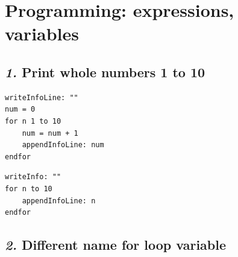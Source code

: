 \documentclass[12pt, english]{article}
\newcommand{\mysection}[2]{\setcounter{section}{#1}\addtocounter{section}{-1}\section{#2}}
\begin{document}

\mysection{2}{Programming: expressions, variables}
\vspace{10pt}

\subsection*{\emph{1.} Print whole numbers 1 to 10} 

\begin{lstlisting}
writeInfoLine: ""
num = 0
for n 1 to 10
    num = num + 1
    appendInfoLine: num
endfor
\end{lstlisting}

\begin{lstlisting}[rulesepcolor=\color{blue}]
writeInfo: ""
for n to 10
    appendInfoLine: n
endfor
\end{lstlisting}

\vspace{10pt}

\subsection*{\emph{2.} Different name for loop variable}
\end{document}
